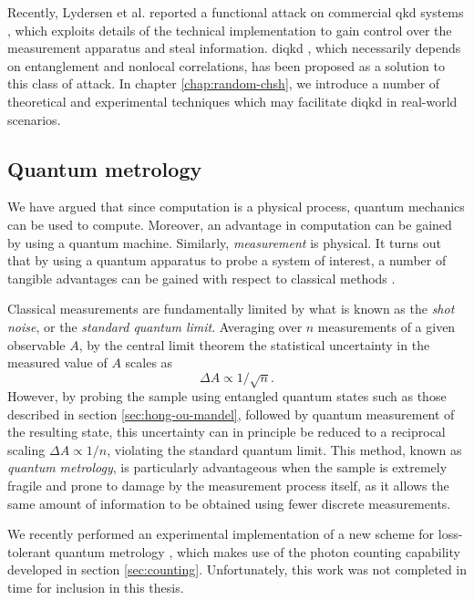 Recently, Lydersen et al. reported a functional attack on commercial \gls{qkd} systems \cite{Lydersen2010}, which exploits details of the technical implementation to gain control over the measurement apparatus and steal information. \Gls{diqkd} \cite{Pironio2009}, which necessarily depends on entanglement and nonlocal correlations, has been proposed as a solution to this class of attack.
In chapter \ref{chap:random-chsh}, we introduce a number of theoretical and experimental techniques which may facilitate \gls{diqkd} in real-world scenarios.

\subsection{Quantum metrology} 
\label{sec:metrology}
We have argued that since computation is a physical process, quantum mechanics can be used to compute. Moreover, an advantage in computation can be gained by using a quantum machine. Similarly, \emph{measurement} is physical. It turns out that by using a quantum apparatus to probe a system of interest, a number of tangible advantages can be gained with respect to classical methods \cite{Giovannetti2004, Giovannetti2011}. 

Classical measurements are fundamentally limited by what is known as the \emph{shot noise}, or the \emph{standard quantum limit}. Averaging over $n$ measurements of a given observable $A$, by the central limit theorem the statistical uncertainty in the measured value of $A$ scales as 
\begin{equation}
\Delta A \propto 1/\sqrt{n}. 
\end{equation}
However, by probing the sample using entangled quantum states such as those described in section \ref{sec:hong-ou-mandel}, followed by quantum measurement of the resulting state, this uncertainty can in principle be reduced to a reciprocal scaling $\Delta A \propto 1/n$, violating the standard quantum limit. This method, known as \emph{quantum metrology}, is particularly advantageous when the sample is extremely fragile and prone to damage by the measurement process itself, as it allows the same amount of information to be obtained using fewer discrete measurements. 

We recently performed an experimental implementation \cite{Matthews2013d} of a new scheme for loss-tolerant quantum metrology \cite{Cable2010}, which makes use of the photon counting capability developed in section \ref{sec:counting}. Unfortunately, this work was not completed in time for inclusion in this thesis.

